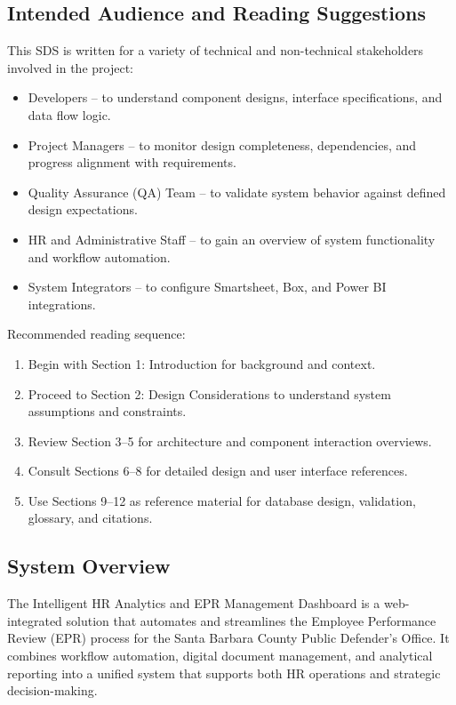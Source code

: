 \documentclass[12pt]{article}
\def\textbf#1{#1}%
\def\&{ and }%
\begin{document}
\subsection{Intended Audience and Reading Suggestions}
This SDS is written for a variety of technical and non-technical stakeholders involved in the project:
\begin{itemize}[nosep]
    \item \textbf{Developers} – to understand component designs, interface specifications, and data flow logic.
    \item \textbf{Project Managers} – to monitor design completeness, dependencies, and progress alignment with requirements.
    \item \textbf{Quality Assurance (QA) Team} – to validate system behavior against defined design expectations.
    \item \textbf{HR and Administrative Staff} – to gain an overview of system functionality and workflow automation.
    \item \textbf{System Integrators} – to configure Smartsheet, Box, and Power BI integrations.
\end{itemize}

Recommended reading sequence:
\begin{enumerate}[nosep]
    \item Begin with \textbf{Section 1: Introduction} for background and context.
    \item Proceed to \textbf{Section 2: Design Considerations} to understand system assumptions and constraints.
    \item Review \textbf{Section 3–5} for architecture and component interaction overviews.
    \item Consult \textbf{Sections 6–8} for detailed design and user interface references.
    \item Use \textbf{Sections 9–12} as reference material for database design, validation, glossary, and citations.
\end{enumerate}

\subsection{System Overview}
The Intelligent HR Analytics \& EPR Management Dashboard is a web-integrated solution that automates and streamlines the Employee Performance Review (EPR) process for the Santa Barbara County Public Defender’s Office.
It combines workflow automation, digital document management, and analytical reporting into a unified system that supports both HR operations and strategic decision-making.
\end{document}

